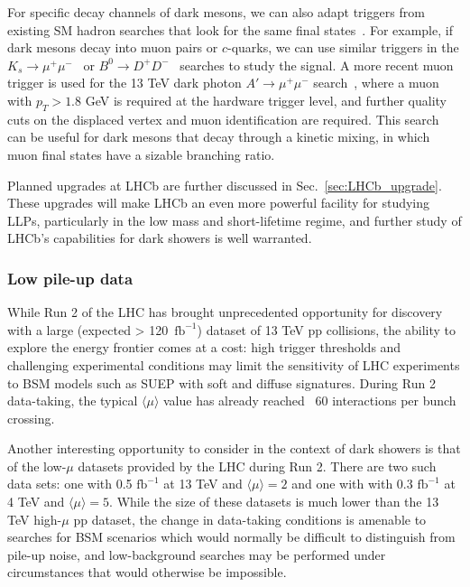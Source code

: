 For specific decay channels of dark mesons, we can also adapt triggers from  existing SM hadron searches that look for the same  final states~\cite{Pierce:2017taw}. For example, if dark mesons decay into muon pairs or $c$-quarks, we can use similar triggers in the $K_s\to\mu^+\mu^-$~\cite{Aaij:2012rt} or $B^0\to D^+D^-$~\cite{Aaij:2016yip} searches to study the signal. A more recent muon trigger is used for the 13 TeV dark photon $A'\to\mu^+\mu^-$ search~\cite{Aaij:2017rft}, where a muon with $p_T>1.8$ GeV is required at the hardware trigger level, and further quality cuts on the displaced vertex and muon identification are required. This search can be useful for dark mesons that decay through a kinetic mixing, in which muon final states have a sizable branching ratio.

Planned upgrades at LHCb are further discussed in Sec.~\ref{sec:LHCb_upgrade}.   These upgrades will make LHCb an even more powerful facility for studying LLPs, particularly in the low mass and short-lifetime regime, and further study of LHCb's capabilities for dark showers is well warranted.

\subsubsection{Low pile-up data}

While Run 2 of the LHC has brought unprecedented opportunity for discovery with a large (expected > \mbox{120 $\text{fb}^{-1}$}) dataset of 13 TeV pp collisions, the ability to explore the energy frontier comes at a cost: high trigger thresholds and challenging experimental conditions may limit the sensitivity of LHC experiments to BSM models such as SUEP with soft and diffuse signatures. During Run 2 data-taking, the typical $\langle \mu\rangle$ value has already reached ~60 interactions per bunch crossing.

Another interesting opportunity to consider in the context of dark showers is that of the low-$\mu$ datasets provided by the LHC during Run 2. There are two such data sets: one with 0.5 $\text{fb}^{-1}$ at 13 TeV and  $\langle\mu\rangle=2$ and one with with 0.3 $\text{fb}^{-1}$ at 4 TeV and  $\langle\mu\rangle=5$. While the size of these datasets is much lower than the 13 TeV high-$\mu$ pp dataset, the change in data-taking conditions is amenable to searches for BSM scenarios which would normally be difficult to distinguish from pile-up noise, and low-background searches may be performed under circumstances that would otherwise be impossible.

